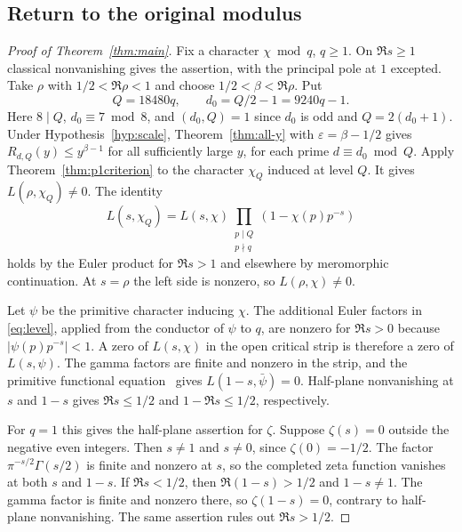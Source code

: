\subsection{Return to the original modulus}
\begin{proof}[Proof of Theorem~\ref{thm:main}]
Fix a character $\chi\bmod q$, $q\ge1$. On $\Re s\ge1$ classical nonvanishing gives the assertion, with the principal pole at $1$ excepted. Take $\rho$ with $1/2<\Re\rho<1$ and choose $1/2<\beta<\Re\rho$. Put
\[
 Q=18480q,\qquad d_0=Q/2-1=9240q-1 .
\]
Here $8\mid Q$, $d_0\equiv7\bmod 8$, and $(d_0,Q)=1$ since $d_0$ is odd and $Q=2(d_0+1)$. Under Hypothesis~\ref{hyp:scale}, Theorem~\ref{thm:all-y} with $\varepsilon=\beta-1/2$ gives $R_{d,Q}(y)\le y^{\beta-1}$ for all sufficiently large $y$, for each prime $d\equiv d_0\bmod Q$. Apply Theorem~\ref{thm:p1criterion} to the character $\chi_Q$ induced at level $Q$. It gives $L(\rho,\chi_Q)\ne0$. The identity
\begin{equation}
 L(s,\chi_Q)=L(s,\chi)\!
 \prod_{\substack{p\mid Q\\p\nmid q}}(1-\chi(p)p^{-s})\label{eq:level}
\end{equation}
holds by the Euler product for $\Re s>1$ and elsewhere by meromorphic continuation. At $s=\rho$ the left side is nonzero, so $L(\rho,\chi)\ne0$.

Let $\psi$ be the primitive character inducing $\chi$. The additional Euler factors in \eqref{eq:level}, applied from the conductor of $\psi$ to $q$, are nonzero for $\Re s>0$ because $|\psi(p)p^{-s}|<1$. A zero of $L(s,\chi)$ in the open critical strip is therefore a zero of $L(s,\psi)$. The gamma factors are finite and nonzero in the strip, and the primitive functional equation~\cite[\S10.1]{MV} gives $L(1-s,\bar\psi)=0$. Half-plane nonvanishing at $s$ and $1-s$ gives $\Re s\le1/2$ and $1-\Re s\le1/2$, respectively.

For $q=1$ this gives the half-plane assertion for $\zeta$. Suppose $\zeta(s)=0$ outside the negative even integers. Then $s\ne1$ and $s\ne0$, since $\zeta(0)=-1/2$. The factor $\pi^{-s/2}\Gamma(s/2)$ is finite and nonzero at $s$, so the completed zeta function vanishes at both $s$ and $1-s$. If $\Re s<1/2$, then $\Re(1-s)>1/2$ and $1-s\ne1$. The gamma factor is finite and nonzero there, so $\zeta(1-s)=0$, contrary to half-plane nonvanishing. The same assertion rules out $\Re s>1/2$.
\end{proof}

